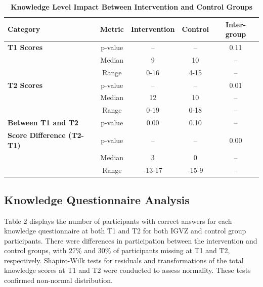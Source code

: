 \documentclass[12pt]{article}
\begin{document}
\begin{table}[htbp]
    \captionsetup{
        justification=raggedright,
        singlelinecheck=false,
        skip=0pt,
        labelfont=bf
    }
    \caption{\textbf{Knowledge Level Impact Between Intervention and Control Groups}}
    \begin{threeparttable}
        \small
        \begin{tabularx}{\textwidth}{Xcccc}
            \toprule
            \textbf{Category} & \textbf{Metric} & \textbf{Intervention} & \textbf{Control} & \textbf{Inter-group} \\
            \midrule
            \textbf{T1 Scores} & p-value & -- & -- & 0.11 \\
                               & Median & 9 & 10 & --\\
                               & Range & 0-16 & 4-15 & -- \\
            \midrule
            \textbf{T2 Scores} & p-value & -- & -- & 0.01\\
                               & Median & 12 & 10 & --\\
                               & Range & 0-19 & 0-18 & --\\
            \midrule
            \textbf{Between T1 and T2} & p-value & 0.00 & 0.10 & --\\
            \midrule
            \textbf{Score Difference (T2-T1)} & p-value & -- & -- & 0.00\\
                                             & Median & 3 & 0 & --\\
                                             & Range & -13-17 & -15-9 & --\\
            \bottomrule
        \end{tabularx}
    \end{threeparttable}
\end{table}

\subsection{Knowledge Questionnaire Analysis}
 
Table 2 displays the number of participants with correct answers for each knowledge questionnaire at both T1 and T2 for both IGVZ and control group participants. There were differences in participation between the intervention and control groups, with 27\% and 30\% of participants missing at T1 and T2, respectively. Shapiro-Wilk tests for residuals and transformations of the total knowledge scores at T1 and T2 were conducted to assess normality. These tests confirmed non-normal distribution. \\
\end{document}
